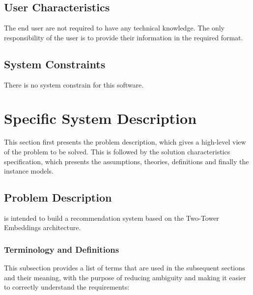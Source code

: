 \documentclass[12pt]{article}
\begin{document}
\subsection{User Characteristics} \label{SecUserCharacteristics}

The end user are not required to have any technical knowledge. The only responsibility of the user is to provide their information in the required format.

\subsection{System Constraints}

There is no system constrain for this software.

\section{Specific System Description}

This section first presents the problem description, which gives a high-level
view of the problem to be solved.  This is followed by the solution characteristics
specification, which presents the assumptions, theories, definitions and finally
the instance models. 

\subsection{Problem Description} \label{Sec_pd}

\progname{} is intended to build a recommendation system based on the Two-Tower Embeddings architecture.


\subsubsection{Terminology and  Definitions}

This subsection provides a list of terms that are used in the subsequent
sections and their meaning, with the purpose of reducing ambiguity and making it
easier to correctly understand the requirements:
\end{document}
